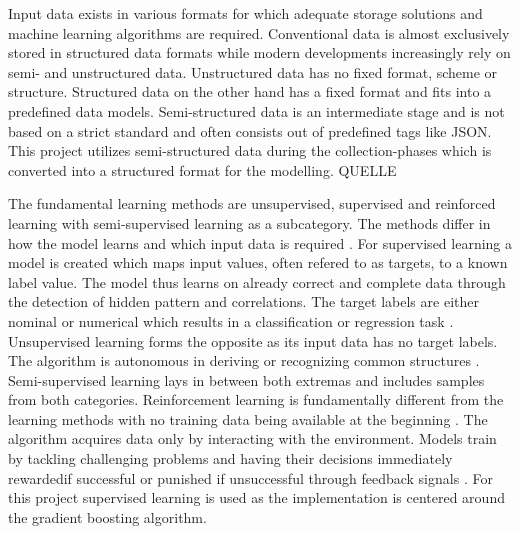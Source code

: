 Input data exists in various formats for which adequate storage solutions and machine learning 
algorithms are required. Conventional data is almost exclusively stored in structured data formats 
while modern developments increasingly rely on semi- and unstructured data. Unstructured data has no
fixed format, scheme or structure. Structured data on the other hand has a fixed format and fits into 
a predefined data models. Semi-structured data is an intermediate stage and is not based on a strict
standard and often consists out of predefined tags like \ac{JSON}. This project utilizes semi-structured 
data during the collection-phases which is converted into a structured format for the modelling. QUELLE

The fundamental learning methods are unsupervised, supervised and reinforced learning with 
semi-supervised learning as a subcategory. The methods differ in how the model learns and which 
input data is required \cite[4]{2018VDMAQuick}. For supervised learning a model is created which 
maps input values, often refered to as targets, to a known label value. The model thus learns 
on already correct and complete data through the detection of hidden pattern and correlations. 
The target labels are either nominal or numerical which results in a classification or regression 
task \cite[46]{Paass2020}.
Unsupervised learning forms the opposite as its input data has no target labels. The algorithm 
is autonomous in deriving or recognizing common structures \cite[97]{schacht2019blockchain}. Semi-supervised learning lays in 
between both extremas and includes samples from both categories. Reinforcement learning is 
fundamentally different from the learning methods with no training data being available at the 
beginning \cite[7]{2018VDMAQuick}. The algorithm acquires data only by interacting with the environment. Models train by 
tackling challenging problems and having their decisions immediately rewardedif successful or 
punished if unsuccessful through feedback signals \cite[98]{schacht2019blockchain}. For this project supervised learning is 
used as the implementation is centered around the gradient boosting algorithm. 


